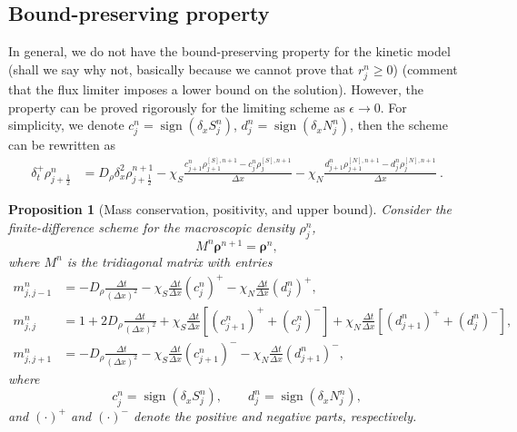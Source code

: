 \documentclass[11pt,twoside]{article}
\theoremstyle{nonumberplain}
\DeclareMathOperator{\sign}{sign}
\newtheorem{proposition}[theorem]{Proposition}
\newcommand{\brho}{\boldsymbol{\rho}}
\newcommand{\GER}{\color{myblue}}
\begin{document}
\subsection{Bound-preserving property}
{In general, we do not have the bound-preserving property for the kinetic model {\GER(shall we say why not, basically because we cannot prove that $r_j^n\geq 0$)} {\GER (comment that the flux limiter imposes a lower bound on the solution)}. However, the property can be proved rigorously for the limiting scheme as $\epsilon\to 0$. 
For simplicity, we denote $c_j^n = \sign(\delta_x S_{j}^n)$, $d_j^n = \sign(\delta_x N_{j}^n)$, then the scheme can be rewritten as 
\begin{align*}
    \delta_t^+\rho_{j+\frac{1}{2}}^n &= D_\rho \delta_x^2 \rho_{j+\frac12}^{n+1} 
    - \chi_S \frac{c_{j+1}^n \rho^{[S],n+1}_{j+1} - c_{j}^n \rho^{[S],n+1}_{j}}{\Delta x} 
    - \chi_N \frac{d_{j+1}^n \rho^{[N],n+1}_{j+1} - d_{j}^n \rho^{[N],n+1}_{j}}{\Delta x}\ .
\end{align*}

\begin{proposition}[Mass conservation, positivity, and upper bound]
Consider the finite-difference scheme for the macroscopic density 
$\rho_j^n$,
\[
M^n \brho^{n+1} = \brho^n ,
\]
where $M^n$ is the tridiagonal matrix with entries
\begin{align*}
m_{j,j-1}^n &= - D_\rho \frac{\Delta t}{(\Delta x)^2}
             - \chi_S \frac{\Delta t}{\Delta x} (c_j^n)^{+}
             - \chi_N \frac{\Delta t}{\Delta x} (d_j^n)^{+}, \\
m_{j,j}^n   &= 1 + 2 D_\rho \frac{\Delta t}{(\Delta x)^2}
             + \chi_S \frac{\Delta t}{\Delta x} \left[(c_{j+1}^n)^{+} + (c_j^n)^{-}\right]
             + \chi_N \frac{\Delta t}{\Delta x} \left[(d_{j+1}^n)^{+} + (d_j^n)^{-}\right], \\
m_{j,j+1}^n &= - D_\rho \frac{\Delta t}{(\Delta x)^2}
             - \chi_S \frac{\Delta t}{\Delta x} (c_{j+1}^n)^{-}
             - \chi_N \frac{\Delta t}{\Delta x} (d_{j+1}^n)^{-},
\end{align*}
where 
\[c_j^n = \operatorname{sign}(\delta_x S_j^n),
\qquad
d_j^n = \operatorname{sign}(\delta_x N_j^n),
\]
and $(\cdot)^{+}$ and $(\cdot)^{-}$ denote the positive and negative parts, respectively.


\end{proposition}}
\end{document}
